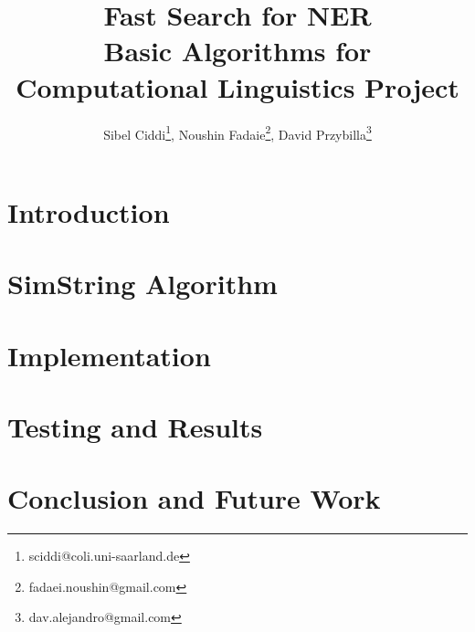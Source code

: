 \documentclass[4pt,a4paper]{article}
\author{Sibel Ciddi\footnote{sciddi@coli.uni-saarland.de},\hspace{5 mm} Noushin Fadaie\footnote{fadaei.noushin@gmail.com},\hspace{5 mm} David Przybilla\footnote{dav.alejandro@gmail.com}}
\title{Fast Search for NER\\Basic Algorithms for Computational Linguistics Project}
\begin{document}
\maketitle


\section{Introduction}
\label{sec:intro}


\section{SimString Algorithm}
\label{sec:algorithm}


\section{Implementation}
\label{sec:implementation}


\section{Testing and Results}
\label{sec:results}


\section{Conclusion and Future Work}
\label{sec:conclusion}

\end{document}

